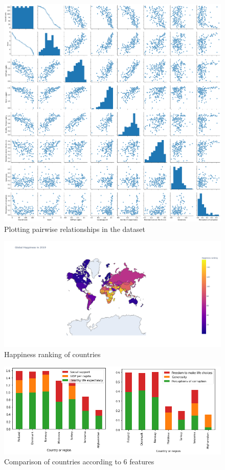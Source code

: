 \documentclass[onecolumn]{article}
\begin{document}
\begin{figure}[htp]
\centering
\includegraphics[scale=0.15]{pairplot.png}
\caption{Plotting pairwise relationships in the dataset}
\end{figure}

\clearpage

\begin{figure}[htp]
\centering
\includegraphics[scale=0.30]{globalmap.png}
\caption{Happiness ranking of countries}
\end{figure}


\begin{figure}[htp]
\centering
\includegraphics[scale=0.70]{country.png}
\caption{Comparison of countries according to 6 features}
\end{figure}
\clearpage
\end{document}
